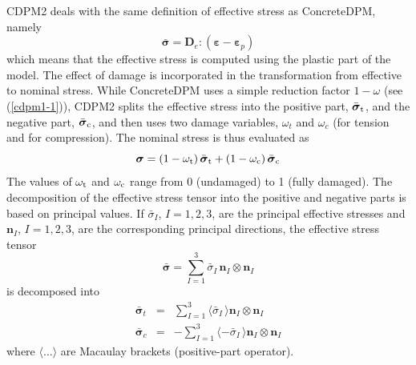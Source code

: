 \documentclass[a4paper]{article}
\begin{document}
CDPM2 deals with the same definition of effective stress as ConcreteDPM, namely
\begin{equation}
    \bar{\boldsymbol{\sigma}} = \boldsymbol{D}_e:(\boldsymbol{\varepsilon}-\boldsymbol{\varepsilon}_p)
\end{equation}
which means that the effective stress is computed using the plastic part of the model.
The effect of damage is incorporated in the transformation from effective to nominal stress.
While ConcreteDPM uses a simple reduction factor $1-\omega$ (see (\ref{cdpm1-1})), CDPM2 splits the
effective stress into the positive part, $\bar{\boldsymbol{\sigma}}_{\rm t}$,
and the negative part, $\bar{\boldsymbol{\sigma}}_{\rm c}$, and then uses 
two damage variables, $\omega_t$ and $\omega_c$ (for tension and for compression). 
The nominal stress is thus evaluated as
\begin{equation}\label{cdpm2:efftonominal}
    \boldsymbol{\sigma} = \left(1-\omega_{\rm t}\right) \bar{\boldsymbol{\sigma}}_{\rm t} + \left(1-\omega_{\rm c}\right) \bar{\boldsymbol{\sigma}}_{\rm c}
\end{equation}
The values of $\omega_{\rm t}$ and $\omega_{\rm c}$ range from 0 (undamaged) to 1 (fully damaged).
The decomposition of the effective stress tensor into the positive and negative parts is based
on principal values. If $\bar{\sigma}_I$, $I=1,2,3$, are the principal effective stresses and $\boldsymbol{n}_I$,
$I=1,2,3$, are the corresponding principal directions, the effective stress tensor
\begin{equation}
    \bar{\boldsymbol{\sigma}} = \sum_{I=1}^3 \bar{\sigma}_I\,\boldsymbol{n}_I\otimes\boldsymbol{n}_I
\end{equation}
is decomposed into
\begin{eqnarray}
  \bar{\boldsymbol{\sigma}}_t &=& \sum_{I=1}^3 \langle\bar{\sigma}_I\,\rangle\boldsymbol{n}_I\otimes\boldsymbol{n}_I \\
  \bar{\boldsymbol{\sigma}}_c &=& -\sum_{I=1}^3 \langle-\bar{\sigma}_I\,\rangle\boldsymbol{n}_I\otimes\boldsymbol{n}_I
\end{eqnarray}
where $\langle\ldots\rangle$ are Macaulay brackets (positive-part operator).
\end{document}
